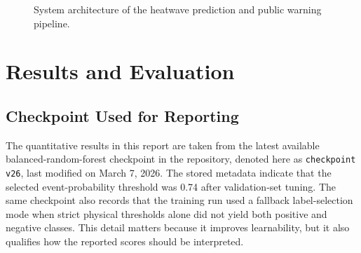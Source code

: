 \documentclass[12pt,a4paper]{article}
\begin{document}
\begin{figure}[H]
\centering
{}
\caption{System architecture of the heatwave prediction and public warning pipeline.}
\label{fig:architecture}
\end{figure}

\section{Results and Evaluation}
\subsection{Checkpoint Used for Reporting}
The quantitative results in this report are taken from the latest available balanced-random-forest checkpoint in the repository, denoted here as \texttt{checkpoint v26}, last modified on March 7, 2026. The stored metadata indicate that the selected event-probability threshold was 0.74 after validation-set tuning. The same checkpoint also records that the training run used a fallback label-selection mode when strict physical thresholds alone did not yield both positive and negative classes. This detail matters because it improves learnability, but it also qualifies how the reported scores should be interpreted.
\end{document}
